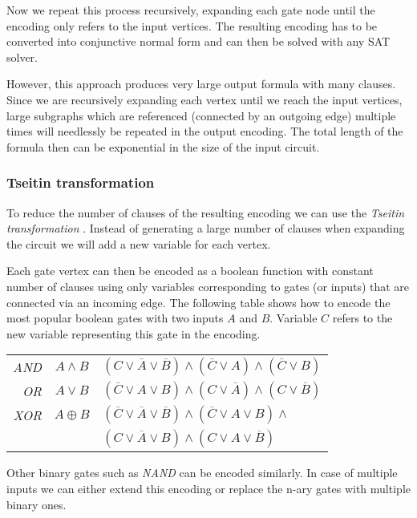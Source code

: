Now we repeat this process recursively, expanding each gate node until the encoding only refers to the input vertices.
The resulting encoding has to be converted into conjunctive normal form and can then be solved with any SAT solver.

However, this approach produces very large output formula with many clauses.
Since we are recursively expanding each vertex until we reach the input vertices, large subgraphs which are referenced (connected by an outgoing edge) multiple times will needlessly be repeated in the output encoding.
The total length of the formula then can be exponential in the size of the input circuit.

\subsubsection{Tseitin transformation}
\label{sec:tseitin}
To reduce the number of clauses of the resulting encoding we can use the \emph{Tseitin transformation} \cite{tseitin1983complexity}.
Instead of generating a large number of clauses when expanding the circuit we will add a new variable for each vertex.

Each gate vertex can then be encoded as a boolean function with constant number of clauses using only variables corresponding to gates (or inputs) that are connected via an incoming edge.
The following table shows how to encode the most popular boolean gates with two inputs $A$ and $B$.
Variable $C$ refers to the new variable representing this gate in the encoding.

\begin{tabular}{r c l}
\emph{AND}& $A\land B$ & $(C \lor \overline{A} \lor \overline{B}) \land (\overline{C} \lor A) \land (\overline{C} \lor B)$ \\
\emph{OR} & $A\lor B$ & $(\overline{C} \lor A \lor B) \land (C \lor \overline{A}) \land (C \lor \overline{B})$ \\
\emph{XOR} & $A\oplus B$ & $(\overline{C} \lor \overline{A} \lor \overline{B}) \land (\overline{C} \lor A \lor B) \land$\\
& & $(C \lor \overline{A} \lor B) \land (C \lor A \lor \overline{B})$
\end{tabular}

Other binary gates such as \emph{NAND} can be encoded similarly.
In case of multiple inputs we can either extend this encoding or replace the n-ary gates with multiple binary ones.

